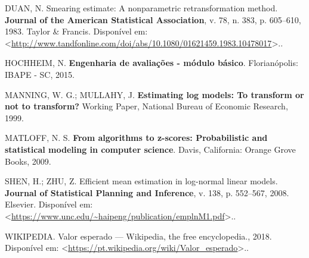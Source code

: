 \documentclass[a4paper]{article}
\begin{document}
\hypertarget{ref-Duan}{}
DUAN, N. Smearing estimate: A nonparametric retransformation method.
\textbf{Journal of the American Statistical Association}, v. 78, n. 383,
p. 605--610, 1983. Taylor \& Francis. Disponível em:
\textless{}\url{http://www.tandfonline.com/doi/abs/10.1080/01621459.1983.10478017}\textgreater{}..

\hypertarget{ref-hochheim}{}
HOCHHEIM, N. \textbf{Engenharia de avaliações - módulo básico}.
Florianópolis: IBAPE - SC, 2015.

\hypertarget{ref-NBERt0246}{}
MANNING, W. G.; MULLAHY, J. \textbf{Estimating log models: To transform
or not to transform?} Working Paper, National Bureau of Economic
Research, 1999.

\hypertarget{ref-matloff2009}{}
MATLOFF, N. S. \textbf{From algorithms to z-scores: Probabilistic and
statistical modeling in computer science}. Davis, California: Orange
Grove Books, 2009.

\hypertarget{ref-shen}{}
SHEN, H.; ZHU, Z. Efficient mean estimation in log-normal linear models.
\textbf{Journal of Statistical Planning and Inference}, v. 138, p.
552--567, 2008. Elsevier. Disponível em:
\textless{}\url{https://www.unc.edu/~haipeng/publication/emplnM1.pdf}\textgreater{}..

\hypertarget{ref-wiki:E}{}
WIKIPEDIA. Valor esperado --- Wikipedia, the free encyclopedia., 2018.
Disponível em:
\textless{}\url{https://pt.wikipedia.org/wiki/Valor_esperado}\textgreater{}..
\end{document}
